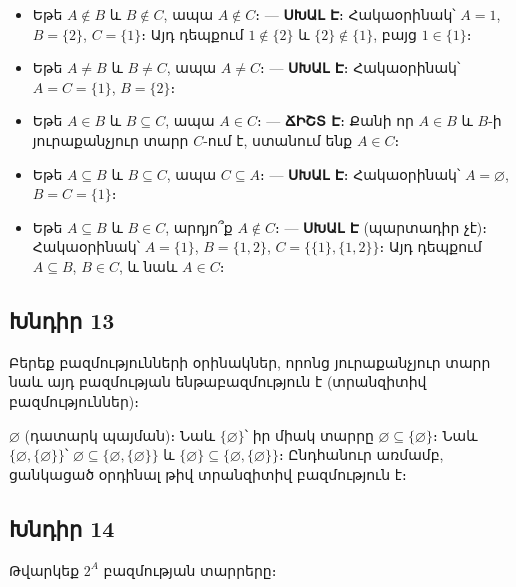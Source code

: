 \begin{itemize}
  \item[(a)] Եթե $A \notin B$ և $B \notin C$, ապա $A \notin C$։ — \textbf{ՍԽԱԼ Է}։
    Հակաօրինակ՝ $A = 1$, $B = \{2\}$, $C = \{1\}$։ Այդ դեպքում $1 \notin \{2\}$ և $\{2\} \notin \{1\}$, բայց $1 \in \{1\}$։
  \item[(b)] Եթե $A \neq B$ և $B \neq C$, ապա $A \neq C$։ — \textbf{ՍԽԱԼ Է}։
    Հակաօրինակ՝ $A = C = \{1\}$, $B = \{2\}$։
  \item[(c)] Եթե $A \in B$ և $B \subseteq C$, ապա $A \in C$։ — \textbf{ՃԻՇՏ Է}։
    Քանի որ $A \in B$ և $B$-ի յուրաքանչյուր տարր $C$-ում է, ստանում ենք $A \in C$։
  \item[(d)] Եթե $A \subseteq B$ և $B \subseteq C$, ապա $C \subseteq A$։ — \textbf{ՍԽԱԼ Է}։
    Հակաօրինակ՝ $A = \varnothing$, $B = C = \{1\}$։
  \item[(e)] Եթե $A \subseteq B$ և $B \in C$, արդյո՞ք $A \notin C$։ — \textbf{ՍԽԱԼ Է} (պարտադիր չէ)։
    Հակաօրինակ՝ $A = \{1\}$, $B = \{1,2\}$, $C = \{\{1\},\{1,2\}\}$։ Այդ դեպքում $A \subseteq B$, $B \in C$, և նաև $A \in C$։
\end{itemize}

\subsection*{Խնդիր 13}
Բերեք բազմությունների օրինակներ, որոնց յուրաքանչյուր տարր նաև այդ բազմության ենթաբազմություն է (տրանզիտիվ բազմություններ)։

$\varnothing$ (դատարկ պայման)։ Նաև $\{\varnothing\}$՝ իր միակ տարրը $\varnothing \subseteq \{\varnothing\}$։
Նաև $\{\varnothing, \{\varnothing\}\}$՝ $\varnothing \subseteq \{\varnothing, \{\varnothing\}\}$ և $\{\varnothing\} \subseteq \{\varnothing, \{\varnothing\}\}$։
Ընդհանուր առմամբ, ցանկացած օրդինալ թիվ տրանզիտիվ բազմություն է։

\subsection*{Խնդիր 14}
Թվարկեք $2^A$ բազմության տարրերը։

